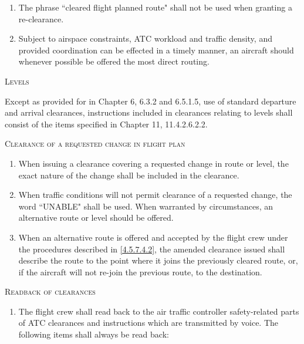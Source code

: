\documentclass[../vATM.tex]{subfiles}
\begin{document}
\begin{enumeratesc}
\begin{enumerate}
            \item The phrase ``cleared flight planned route" shall not be used when granting a re-clearance.
            \item Subject to airspace constraints, ATC workload and traffic density, and provided coordination can be effected in a timely manner, an aircraft should whenever possible be offered the most direct routing.
        \end{enumerate}

        \item \textsc{Levels}
        \begin{enumempty}
            \item Except as provided for in Chapter 6, 6.3.2 and 6.5.1.5, use of standard departure and arrival clearances, instructions included in clearances relating to levels shall consist of the items specified in Chapter 11, 11.4.2.6.2.2.
        \end{enumempty}

        \item \textsc{Clearance of a requested change in flight plan}
        \begin{enumerate}
            \item When issuing a clearance covering a requested change in route or level, the exact nature of the change shall be included in the clearance.
            \item \label{4.5.7.4.2} When traffic conditions will not permit clearance of a requested change, the word ``UNABLE" shall be used. When warranted by circumstances, an alternative route or level should be offered.
            \item When an alternative route is offered and accepted by the flight crew under the procedures described in \ref{4.5.7.4.2}, the amended clearance issued shall describe the route to the point where it joins the previously cleared route, or, if the aircraft will not re-join the previous route, to the destination.
        \end{enumerate}

        \item \textsc{Readback of clearances}
        \begin{enumerate}
            \item The flight crew shall read back to the air traffic controller safety-related parts of ATC clearances and instructions which are transmitted by voice. The following items shall always be read back:


\end{enumerate}
\end{enumeratesc}
\end{document}
